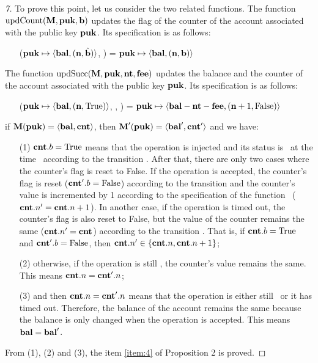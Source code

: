 \documentclass[runningheads]{llncs}
\begin{document}
\begin{proof}[7]To prove this point, let us consider the two related functions. The function $\textup{updCount}(\textbf{M}, \textbf{puk}, \textbf{b})$ updates the flag of the counter of the account associated with the public key $\textbf{puk}$. Its specification is as follows:
 \begin{itemize}
   \item[] \UPDATECOU($\textbf{puk} \mapsto \langle \textbf{bal}, (\textbf{n}, \hat{\textbf{b}}) \rangle$, \BOOLEAN) = $\textbf{puk} \mapsto \langle \textbf{bal}, (\textbf{n}, \textbf{b}) \rangle $
 \end{itemize}
    
    The function $\textup{updSucc}(\textbf{M}, \textbf{puk}, \textbf{nt}, \textbf{fee})$ updates the balance and the counter of the account associated with the public key $\textbf{puk}$. Its specification is as follows:
 \begin{itemize}
   \item[]  \UPDATESUCC($\textbf{puk} \mapsto \langle\textbf{bal}, (\textbf{n}, \text{True})\rangle$, \NTEZ, \MTEZ) = $ \textbf{puk} \mapsto \langle\textbf{bal} - \textbf{nt} - \textbf{fee}, (\textbf{n} + 1, \text{False})\rangle$    
 \end{itemize}
    
\noindent if $\textbf{M} (\textbf{puk}) =
   \langle\textbf{bal}, \textbf{cnt}\rangle$, 
   then $\textbf{M}' (\textbf{puk}) =
   \langle\textbf{bal}', \textbf{cnt}'\rangle$ and we have:
 \begin{itemize}
   \item[(1)] $\textbf{cnt}.b=\text{True}$ means that the operation is injected and its status is \STATUSPENDING\ at the time \TIME \ according to the transition .  After that, there are only two cases where the counter's flag is reset to False. If the operation is accepted, the counter's flag is reset ($\textbf{cnt}'.b=\text{False}$) according to the transition  and the counter's value is incremented by 1 according to the specification of the function \UPDATESUCC\ ($\textbf{cnt}.n' =\textbf{cnt}.n+1$). In another case, if the operation is timed out, the counter's flag is also reset to False, but the value of the counter remains the same ($\textbf{cnt}.n' =\textbf{cnt}$) according to the transition . That is, if $\textbf{cnt}.b=\text{True}$ and $\textbf{cnt}'.b=\text{False}$, then $\textbf{cnt}.n' \in \{\textbf{cnt}.n, \textbf{cnt}.n+1\}$;
   \item[(2)] otherwise, if the operation is still \STATUSPENDING, the counter's value remains the same. This means $\textbf{cnt}.n = \textbf{cnt}'.n$; 
   \item[(3)] and then $\textbf{cnt}.n = \textbf{cnt}'.n$ means that the operation is either still \STATUSPENDING\ or  it has timed out. Therefore, the balance of the account remains the same because the balance is only changed when the operation is accepted. This means $\textbf{bal} = \textbf{bal}'$.
 \end{itemize}
 
 From (1), (2) and (3), the item \ref{item:4} of Proposition 2 is proved.
\end{proof}
\end{document}

